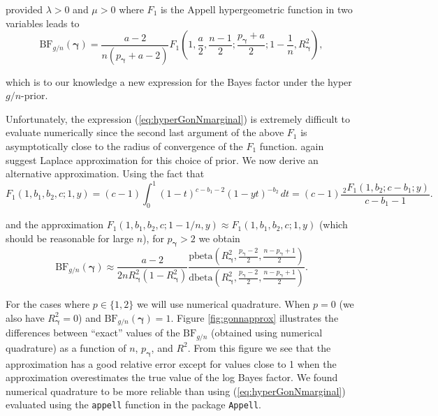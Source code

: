 \documentclass[12pt]{article}
\def\vectorfonttwo{\boldsymbol}
\def\vgamma{{\vectorfonttwo \gamma}}             %
\def\ds{\displaystyle}
\begin{document}
\noindent provided $\lambda>0$ and $\mu>0$
where
$F_1$ is the Appell hypergeometric function in two variables 
\cite{Weisstein2009} 
leads to
\begin{equation}\label{eq:hyperGonNmarginal}
\ds \mbox{BF}_{g/n}(\vgamma) =  \frac{a - 2}{n(p_\vgamma + a - 2)} F_1\left( 1, \frac{a}{2}, \frac{n-1}{2}; \frac{p_\vgamma + a}{2}; 1  -  \frac{1}{n}, R_\vgamma^2 \right),
\end{equation}

\noindent which is to our knowledge a new expression for the Bayes factor under the hyper $g/n$-prior.


Unfortunately, the expression (\ref{eq:hyperGonNmarginal}) is extremely
difficult to evaluate numerically since the second last argument of the above 
$F_1$ is asymptotically close to the radius of convergence of the $F_1$
function.
\cite{Liang2008} again suggest Laplace approximation 
for this choice of prior. We now derive an alternative approximation.
Using the fact that
$$
F_1(1,b_1,b_2,c; 1,y) 
= (c - 1)
\int_0^1  (1-t)^{c-b_1-2} (1-yt)^{-b_2} \, dt
= (c - 1) \frac{\, _2F_1(1,b_2;c-b_1;y)}{c-b_1-1}.
$$
 
\noindent and the approximation $F_1(1,b_1,b_2,c; 1-1/n,y)  \approx F_1(1,b_1,b_2,c; 1,y)$
(which should be reasonable for large $n$),
for $p_\vgamma > 2$ we obtain
\begin{equation}\label{eq:hyperGonNmarginalApprox}
\ds \mbox{BF}_{g/n}(\vgamma) 
\approx    
\frac{a - 2}{2n R_\vgamma^2(1 - R_\vgamma^2)}   \frac{
	\mbox{pbeta}\left( R_\vgamma^2, \frac{p_\vgamma-2}{2}, \frac{n-p_\vgamma+1}{2} \right)
}{
	\mbox{dbeta}\left( R_\vgamma^2, \frac{p_\vgamma-2}{2}, \frac{n-p_\vgamma+1}{2} \right)
}.
\end{equation}

\noindent For the cases where $p\in \{1,2\}$ we
will use numerical quadrature. When $p=0$ (we also have $R_\vgamma^2= 0$) and $\mbox{BF}_{g/n}(\vgamma) = 1$.
Figure \ref{fig:gonnapprox} illustrates the differences between ``exact'' values of the $\mbox{BF}_{g/n}$
(obtained using numerical quadrature) as a function of $n$, $p_\vgamma$, and $R^2$. From this figure we
see that the approximation has a good relative error except for values close to 1 when the approximation
overestimates the true value of the log Bayes factor. We found numerical quadrature to be more reliable
than using (\ref{eq:hyperGonNmarginal}) evaluated using the {\tt appell} function in the package 
{\tt Appell}.
\end{document}
